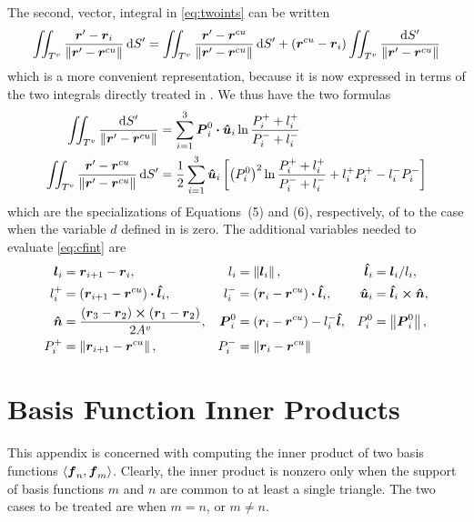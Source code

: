 \documentclass[
letterpaper, %
11pt, %
oneside, 
onecolumn, %
openany, %
]{memoir}
\numberwithin{equation}{chapter}
\numberwithin{figure}{chapter}
\begin{document}
 The second, vector, integral in \eqref{eq:twoints} can be written
 \begin{equation}
   \iint_{T^v} \frac{\boldsymbol{r}'-\boldsymbol{r}_i}{\left\lVert\boldsymbol{r}' - \boldsymbol{r}^{cu}\right\rVert} \, \text{d} S' =
   \iint_{T^v} \frac{\boldsymbol{r}'-\boldsymbol{r}^{cu}}{\left\lVert\boldsymbol{r}' - \boldsymbol{r}^{cu}\right\rVert} \, \text{d} S' +
   (\boldsymbol{r}^{cu} - \boldsymbol{r}_i) \iint_{T^v} \frac{\text{d} S'}{\left\lVert\boldsymbol{r}' - \boldsymbol{r}^{cu}\right\rVert}
 \end{equation}
 which is a more convenient representation, because it is now
 expressed in terms of the two integrals directly treated in \cite{wrgs:84}.
 We thus have the two formulas
 \begin{subequations}
   \label{eq:cfint}
   \begin{align}
     \iint_{T^v} \frac{\text{d} S'}{\left\lVert\boldsymbol{r}' - \boldsymbol{r}^{cu}\right\rVert} &= 
     \sum_{i=1}^{3} \boldsymbol{P}_i^0 \boldsymbol{\cdot} \boldsymbol{\hat{u}}_i \ln \frac{P_i^+ + l_i^+}{P_i^- + l_i^-} \\
     \iint_{T^v} \frac{\boldsymbol{r}'-\boldsymbol{r}^{cu}}{\left\lVert\boldsymbol{r}' - \boldsymbol{r}^{cu}\right\rVert} \, \text{d} S' &=
     \frac{1}{2} \sum_{i=1}^{3} \boldsymbol{\hat{u}}_i 
     \left[
       \left( P_i^0 \right)^2 
       \ln \frac{P_i^+ + l_i^+}{P_i^- + l_i^-}
       + l_i^+ P_i^+ - l_i^- P_i^-
     \right]
 \end{align} 
\end{subequations}
\noindent
which are the specializations of Equations~(5) and (6), respectively, of 
\cite{wrgs:84} to the case when the variable $d$ defined in \cite{wrgs:84}
is zero.  The additional variables needed to evaluate \eqref{eq:cfint} are
\begin{subequations}
\begin{align}
  \boldsymbol{l}_i &= \boldsymbol{r}_{i+1} - \boldsymbol{r}_i, & l_i &= \left\lVert\boldsymbol{l}_i\right\rVert, & \boldsymbol{\hat{l}}_i &= \boldsymbol{l}_i / l_i, \\
  l_i^+ &= (\boldsymbol{r}_{i+1} - \boldsymbol{r}^{cu}) \boldsymbol{\cdot} \boldsymbol{\hat{l}}_i, & 
  l_i^- &= (\boldsymbol{r}_{i} - \boldsymbol{r}^{cu}) \boldsymbol{\cdot} \boldsymbol{\hat{l}}_i, &
  \boldsymbol{\hat{u}}_i &= \boldsymbol{\hat{l}}_i \boldsymbol{\times} \boldsymbol{\hat{n}}, \\
  \boldsymbol{\hat{n}} &= \frac{(\boldsymbol{r}_3-\boldsymbol{r}_2)\boldsymbol{\times}(\boldsymbol{r}_1-\boldsymbol{r}_2)}{2A^v}, &
  \boldsymbol{P}_i^0 &= (\boldsymbol{r}_i - \boldsymbol{r}^{cu}) - l_i^- \boldsymbol{\hat{l}}, &
  P_i^0 &= \left\lVert\boldsymbol{P}_i^0\right\rVert, \\
  P_i^+ &= \left\lVert\boldsymbol{r}_{i+1} - \boldsymbol{r}^{cu}\right\rVert, &  P_i^- &= \left\lVert\boldsymbol{r}_{i} - \boldsymbol{r}^{cu}\right\rVert
\end{align}
\end{subequations}


\chapter{Basis Function Inner Products\label{ap:ip}}
This appendix is concerned with computing the inner product of two basis
functions $\left< \boldsymbol{f}_n, \boldsymbol{f}_m \right>$.  Clearly, the inner product is nonzero 
only when the support of basis functions $m$ and $n$ are common to at 
least a single triangle.  The  
two cases to be treated are when $m=n$, or $m \neq n$.
\end{document}
